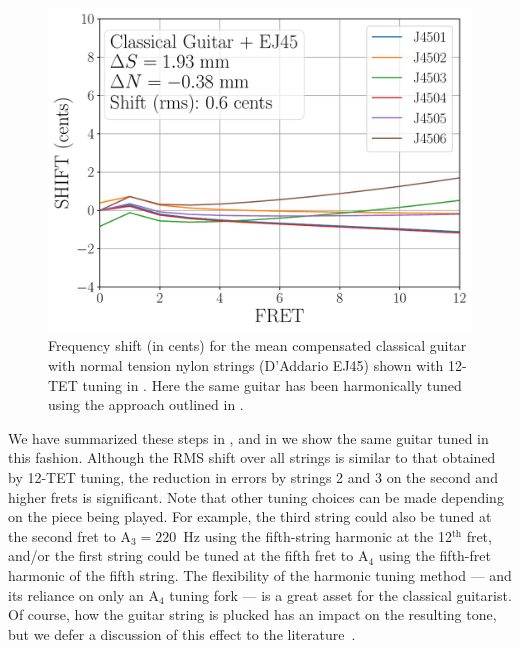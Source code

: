  \begin{figure}
  \centering
  \includegraphics[width=5.0in]{figures/shift_classicalguitar_ej45_harmonic}
  \caption{\label{fig:shift_classicalguitar_ej45_harmonic} Frequency shift (in cents) for the mean compensated classical guitar with normal tension nylon strings (D'Addario EJ45) shown with 12-TET tuning in . Here the same guitar has been harmonically tuned using the approach outlined in .}
\end{figure}

 We have summarized these steps in , and in  we show the same guitar tuned in this fashion. Although the RMS shift over all strings is similar to that obtained by 12-TET tuning, the reduction in errors by strings 2 and 3 on the second and higher frets is significant. Note that other tuning choices can be made depending on the piece being played. For example, the third string could also be tuned at the second fret to A$_3 = 220$~Hz using the fifth-string harmonic at the 12$^\text{th}$ fret, and/or the first string could be tuned at the fifth fret to A$_4$ using the fifth-fret harmonic of the fifth string. The flexibility of the harmonic tuning method --- and its reliance on only an A$_4$ tuning fork --- is a great asset for the classical guitarist. Of course, how the guitar string is plucked has an impact on the resulting tone, but we defer a discussion of this effect to the literature~\cite{ref:laurson2001mmr,ref:migneco2011ems}.




